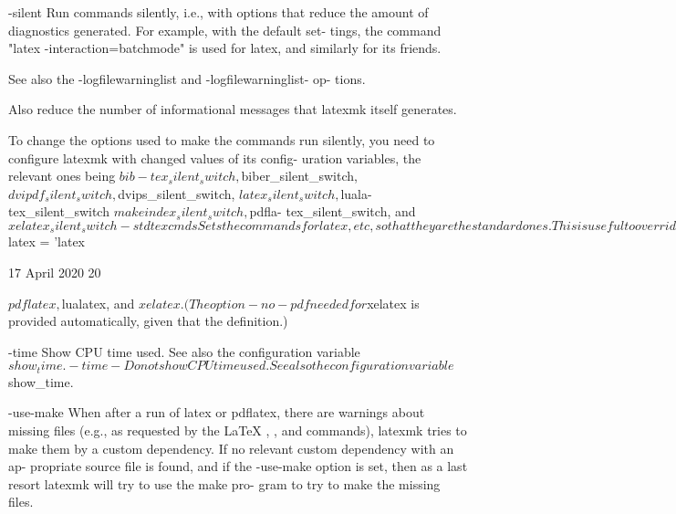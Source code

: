        -silent
              Run commands silently, i.e., with options that reduce the amount
              of  diagnostics  generated.   For example, with the default set-
              tings, the command "latex -interaction=batchmode"  is  used  for
              latex, and similarly for its friends.

              See  also  the  -logfilewarninglist and -logfilewarninglist- op-
              tions.

              Also reduce the number of informational  messages  that  latexmk
              itself generates.

              To  change  the  options used to make the commands run silently,
              you need to configure latexmk with changed values of its config-
              uration    variables,    the    relevant    ones   being   $bib-
              tex_silent_switch, $biber_silent_switch,  $dvipdf_silent_switch,
              $dvips_silent_switch,        $latex_silent_switch,       $luala-
              tex_silent_switch       $makeindex_silent_switch,        $pdfla-
              tex_silent_switch, and $xelatex_silent_switch


       -stdtexcmds
              Sets  the commands for latex, etc, so that they are the standard
              ones. This is useful to override special configurations.

              The result is that $latex = 'latex %



                                 17 April 2020                              20








              $pdflatex,  $lualatex, and $xelatex.  (The option -no-pdf needed
              for $xelatex is provided automatically, given that %
              the definition.)


       -time  Show  CPU  time  used.   See  also  the  configuration  variable
              $show_time.


       -time- Do not show CPU time used.  See also the configuration  variable
              $show_time.


       -use-make
              When  after a run of latex or pdflatex, there are warnings about
              missing files (e.g., as requested by the LaTeX , ,
              and  \includgraphics  commands), latexmk tries to make them by a
              custom dependency. If no relevant custom dependency with an  ap-
              propriate  source  file is found, and if the -use-make option is
              set, then as a last resort latexmk will try to use the make pro-
              gram to try to make the missing files.


